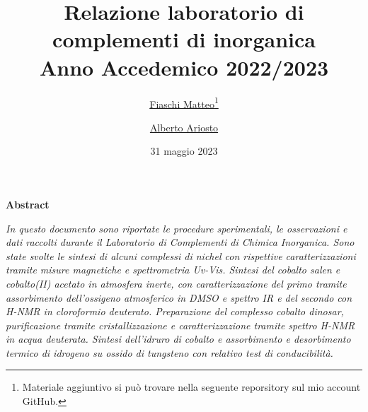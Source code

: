 \documentclass[10pt]{article}
\title{\huge{Relazione laboratorio di complementi di inorganica}
\vspace{1mm}\\
\Large{Anno Accedemico 2022/2023}}
\author{\href{mailto:m.fiaschi10@studenti.unipi.it}{Fiaschi Matteo\footnote{Materiale aggiuntivo si può trovare nella seguente reporsitory sul mio account \href{https://github.com/mfiaschi5/labinorganica}{GitHub}.}} \and \href{mailto:a.ariosto@studenti.unipi.it}{Alberto Ariosto}}
\date{31 maggio 2023}
\begin{document}
\maketitle
\begin{center}
    \textbf{Abstract}
\end{center}
\noindent \textit{ In questo documento sono riportate le procedure sperimentali, le osservazioni e dati raccolti durante il Laboratorio di Complementi di Chimica Inorganica. Sono state svolte le sintesi di alcuni complessi di nichel con rispettive caratterizzazioni tramite misure magnetiche e spettrometria Uv-Vis. Sintesi del cobalto salen e cobalto(II) acetato in atmosfera inerte, con caratterizzazione del primo tramite assorbimento dell'ossigeno atmosferico in DMSO e spettro IR e del secondo con H-NMR in cloroformio deuterato. Preparazione del complesso cobalto dinosar, purificazione tramite cristallizzazione e  caratterizzazione tramite spettro H-NMR in acqua deuterata. Sintesi dell'idruro di  cobalto e assorbimento e desorbimento termico di idrogeno su ossido di tungsteno con relativo test di conducibilità. }










\end{document}

